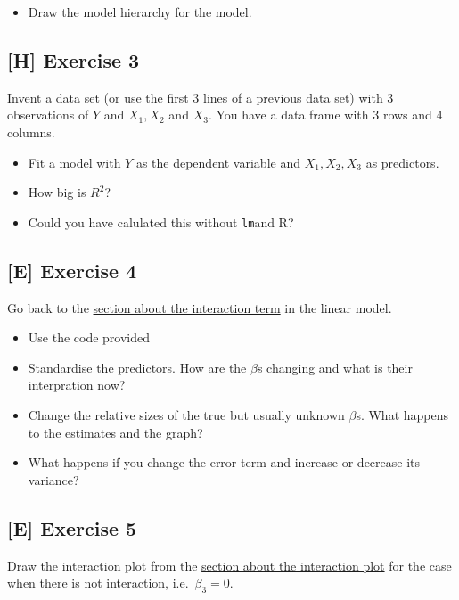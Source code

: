 \documentclass[
]{book}
\providecommand{\tightlist}{%
  \setlength{\itemsep}{0pt}\setlength{\parskip}{0pt}}
\begin{document}
\begin{itemize}
\tightlist
\item
  Draw the model hierarchy for the model.
\end{itemize}

\subsection{{[}H{]} Exercise 3}\label{exercise3_multiple_regression}

Invent a data set (or use the first 3 lines of a previous data set)
with 3 observations of \(Y\) and \(X_1, X_2\) and \(X_3\). You have a data frame
with 3 rows and 4 columns.

\begin{itemize}
\tightlist
\item
  Fit a model with \(Y\) as the dependent variable and \(X_1, X_2, X_3\) as predictors.
\item
  How big is \(R^2\)?
\item
  Could you have calulated this without \texttt{lm}and R?
\end{itemize}

\subsection{{[}E{]} Exercise 4}\label{exercise4_multiple_regression}

Go back to the \hyperref[interaction_term]{section about the interaction term} in the linear model.

\begin{itemize}
\tightlist
\item
  Use the code provided
\item
  Standardise the predictors. How are the \(\beta\)s changing and what is their interpration now?
\item
  Change the relative sizes of the true but usually unknown \(\beta\)s.
  What happens to the estimates and the graph?
\item
  What happens if you change the error term and increase or decrease its variance?
\end{itemize}

\subsection{{[}E{]} Exercise 5}\label{exercise5_multiple_regression}

Draw the interaction plot from the \hyperref[interaction_plot]{section about the interaction plot}
for the case when there is not interaction, i.e.~\(\beta_3 = 0\).
\end{document}

